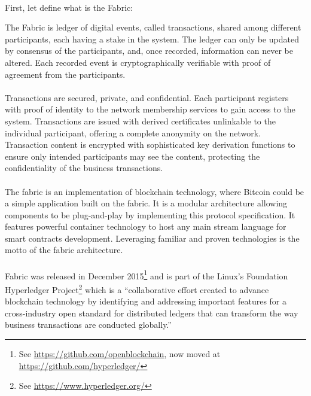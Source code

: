  			\paragraph{}
 			First, let define what is the Fabric:
 			\begin{displayquote}The Fabric is ledger of digital events, called transactions, shared among different participants, each having a stake in the system. The ledger can only be updated by consensus of the participants, and, once recorded, information can never be altered. Each recorded event is cryptographically verifiable with proof of agreement from the participants.
 			\paragraph{}
 			Transactions are secured, private, and confidential. Each participant registers with proof of identity to the network membership services to gain access to the system. Transactions are issued with derived certificates unlinkable to the individual participant, offering a complete anonymity on the network. Transaction content is encrypted with sophisticated key derivation functions to ensure only intended participants may see the content, protecting the confidentiality of the business transactions.
 			\paragraph{}
 			The fabric is an implementation of blockchain technology, where Bitcoin could be a simple application built on the fabric. It is a modular architecture allowing components to be plug-and-play by implementing this protocol specification. It features powerful container technology to host any main stream language for smart contracts development. Leveraging familiar and proven technologies is the motto of the fabric architecture.
 			\end{displayquote}
 			\paragraph{}
 			Fabric was released in December 2015\footnote{See \url{https://github.com/openblockchain}, now moved at  \url{https://github.com/hyperledger/}} and is part of the Linux's Foundation Hyperledger Project\footnote{See \url{https://www.hyperledger.org/}} which is a ``collaborative effort created to advance blockchain technology by identifying and addressing important features for a cross-industry open standard for distributed ledgers that can transform the way business transactions are conducted globally.''
